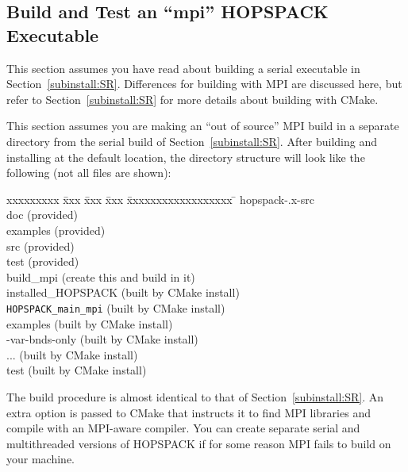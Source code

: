 \subsection{Build and Test an ``mpi'' HOPSPACK Executable}
\label{subinstall:MP}

This section assumes you have read about building a serial executable in
Section~\ref{subinstall:SR}.  Differences for building with MPI are discussed
here, but refer to Section~\ref{subinstall:SR} for more details about building
with CMake.

This section assumes you are making an ``out of source'' MPI build in a separate
directory from the serial build of Section~\ref{subinstall:SR}.
After building and installing at the default location,
the directory structure will look like the following (not all files are shown):
\vspace{-11pt}
\begin{tabbing}
  xxxxxxxxx \= xxx \= xxx \= xxx \= xxxxxxxxxxxxxxxxxx \= \kill
  \> {\sf hopspack-\HOPSVER.x-src}  \\
  \> \> {\sf doc}                      \> \> \> (provided)    \\
  \> \> {\sf examples}                 \> \> \> (provided)    \\
  \> \> {\sf src}                      \> \> \> (provided)    \\
  \> \> {\sf test}                     \> \> \> (provided)    \\
  \> {\sf build\_mpi}               \> \> \> \> (create this and build in it)  \\
  \> \> {\sf installed\_HOPSPACK}      \> \> \> (built by CMake install)  \\
  \> \> \> {\tt HOPSPACK\_main\_mpi}      \> \> (built by CMake install)  \\
  \> \> \> {\sf examples}                 \> \> (built by CMake install)  \\
  \> \> \> \> {-var-bnds-only}          \> (built by CMake install)  \\
  \> \> \> \> {\sf ...}                      \> (built by CMake install)  \\
  \> \> \> {\sf test}                     \> \> (built by CMake install)
\end{tabbing}

The build procedure is almost identical to that of Section~\ref{subinstall:SR}.
An extra option is passed to CMake that instructs it to find
MPI libraries and compile with an MPI-aware compiler.
You can create separate serial and multithreaded versions of HOPSPACK if for
some reason MPI fails to build on your machine.

